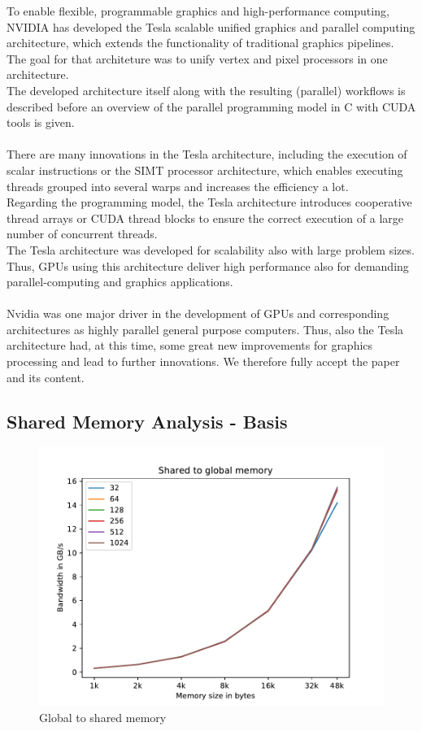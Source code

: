 \documentclass[12pt]{article}
\begin{document}
To enable flexible, programmable graphics and high-performance computing, NVIDIA has developed the Tesla scalable unified graphics and parallel computing architecture, which extends the functionality of traditional graphics pipelines. The goal for that architeture was to unify vertex and pixel processors in one architecture.\\
The developed architecture itself along with the resulting (parallel) workflows is described before an overview of the parallel programming model in C with CUDA tools is given.\\\\
There are many innovations in the Tesla architecture, including the execution of scalar instructions or the SIMT processor architecture, which enables executing threads grouped into several warps and increases the efficiency a lot.\\
Regarding the programming model, the Tesla architecture introduces cooperative thread arrays or CUDA thread blocks to ensure the correct execution of a large number of concurrent threads.\\
The Tesla architecture was developed for scalability also with large problem sizes. Thus, GPUs using this architecture deliver high performance also for demanding parallel-computing and graphics applications. \\\\
Nvidia was one major driver in the development of GPUs and corresponding architectures as highly parallel general purpose computers. Thus, also the Tesla architecture had, at this time, some great new improvements for graphics processing and lead to further innovations. We therefore fully accept the paper and its content.
\vspace{10pt}

\subsection{Shared Memory Analysis - Basis}

\begin{figure}
	\centering
	\includegraphics[width=0.7\linewidth]{../../template/plots/aufgabe4_2a}
	\caption{Global to shared memory}
	\label{fig:aufgabe42a}
\end{figure}
\end{document}
